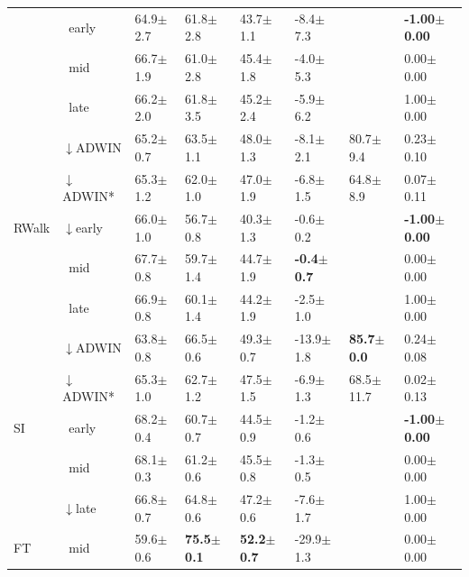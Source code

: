 \begin{tabular}{llllllll}
 & $\ \;$early & 64.9\tiny{$\pm$2.7} & 61.8\tiny{$\pm$2.8} & 43.7\tiny{$\pm$1.1} & -8.4\tiny{$\pm$7.3} &  & \textbf{-1.00\tiny{$\pm$0.00}} \\
 & $\ \;$mid & 66.7\tiny{$\pm$1.9} & 61.0\tiny{$\pm$2.8} & 45.4\tiny{$\pm$1.8} & -4.0\tiny{$\pm$5.3} &  & 0.00\tiny{$\pm$0.00} \\
 & $\ \;$late & 66.2\tiny{$\pm$2.0} & 61.8\tiny{$\pm$3.5} & 45.2\tiny{$\pm$2.4} & -5.9\tiny{$\pm$6.2} &  & 1.00\tiny{$\pm$0.00} \\
\midrule
\multirow[t]{5}{*}{RWalk} & $\downarrow$ADWIN & 65.2\tiny{$\pm$0.7} & 63.5\tiny{$\pm$1.1} & 48.0\tiny{$\pm$1.3} & -8.1\tiny{$\pm$2.1} & 80.7\tiny{$\pm$9.4} & 0.23\tiny{$\pm$0.10} \\
 & $\downarrow$ADWIN* & 65.3\tiny{$\pm$1.2} & 62.0\tiny{$\pm$1.0} & 47.0\tiny{$\pm$1.9} & -6.8\tiny{$\pm$1.5} & 64.8\tiny{$\pm$8.9} & 0.07\tiny{$\pm$0.11} \\
 & $\downarrow$early & 66.0\tiny{$\pm$1.0} & 56.7\tiny{$\pm$0.8} & 40.3\tiny{$\pm$1.3} & -0.6\tiny{$\pm$0.2} &  & \textbf{-1.00\tiny{$\pm$0.00}} \\
 & $\ \;$mid & 67.7\tiny{$\pm$0.8} & 59.7\tiny{$\pm$1.4} & 44.7\tiny{$\pm$1.9} & \textbf{-0.4\tiny{$\pm$0.7}} &  & 0.00\tiny{$\pm$0.00} \\
 & $\ \;$late & 66.9\tiny{$\pm$0.8} & 60.1\tiny{$\pm$1.4} & 44.2\tiny{$\pm$1.9} & -2.5\tiny{$\pm$1.0} &  & 1.00\tiny{$\pm$0.00} \\
\midrule
\multirow[t]{5}{*}{SI} & $\downarrow$ADWIN & 63.8\tiny{$\pm$0.8} & 66.5\tiny{$\pm$0.6} & 49.3\tiny{$\pm$0.7} & -13.9\tiny{$\pm$1.8} & \textbf{85.7\tiny{$\pm$0.0}} & 0.24\tiny{$\pm$0.08} \\
 & $\downarrow$ADWIN* & 65.3\tiny{$\pm$1.0} & 62.7\tiny{$\pm$1.2} & 47.5\tiny{$\pm$1.5} & -6.9\tiny{$\pm$1.3} & 68.5\tiny{$\pm$11.7} & 0.02\tiny{$\pm$0.13} \\
 & $\ \;$early & 68.2\tiny{$\pm$0.4} & 60.7\tiny{$\pm$0.7} & 44.5\tiny{$\pm$0.9} & -1.2\tiny{$\pm$0.6} &  & \textbf{-1.00\tiny{$\pm$0.00}} \\
 & $\ \;$mid & 68.1\tiny{$\pm$0.3} & 61.2\tiny{$\pm$0.6} & 45.5\tiny{$\pm$0.8} & -1.3\tiny{$\pm$0.5} &  & 0.00\tiny{$\pm$0.00} \\
 & $\downarrow$late & 66.8\tiny{$\pm$0.7} & 64.8\tiny{$\pm$0.6} & 47.2\tiny{$\pm$0.6} & -7.6\tiny{$\pm$1.7} &  & 1.00\tiny{$\pm$0.00} \\
\midrule
FT & $\ \;$mid & 59.6\tiny{$\pm$0.6} & \textbf{75.5\tiny{$\pm$0.1}} & \textbf{52.2\tiny{$\pm$0.7}} & -29.9\tiny{$\pm$1.3} &  & 0.00\tiny{$\pm$0.00} \\
\bottomrule
\end{tabular}
